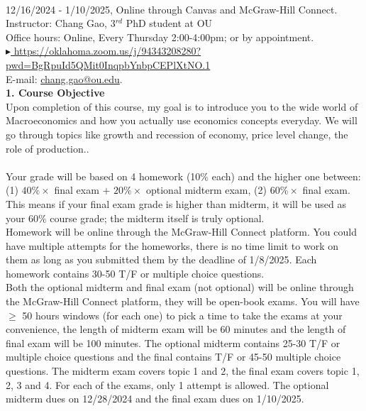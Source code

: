 \documentclass[12pt,letterpaper]{article}
\begin{document}
\bigskip\\
 12/16/2024 - 1/10/2025, Online through Canvas and McGraw-Hill Connect.\medskip\\
\noindent Instructor: Chang Gao, 3$^{\textit{rd}}$ PhD student at OU\medskip\\
\noindent Office hours: Online, Every Thursday 2:00-4:00pm; or by appointment.\medskip\\ \href{https://oklahoma.zoom.us/j/94343208280?pwd=BgRpuId5QMit0InqpbYnbpCEPlXtNO.1
}{\color{blue}$\blacktriangleright$ https://oklahoma.zoom.us/j/94343208280?pwd=BgRpuId5QMit0InqpbYnbpCEPlXtNO.1
}\\
\noindent E-mail: \href{mailto:chang.gao@ou.edu}{chang.gao@ou.edu}.\bigskip\\
{\bf 1. Course Objective}\medskip\\
Upon completion of this course, my goal is to introduce you to the wide world of Macroeconomics and how you actually use economics concepts everyday. We will go through topics like growth and recession of economy, price level change, the role of production..\bigskip\\
\medskip\\
Your grade will be based on 4 homework (10\% each) and {\color{red}the higher one between}: (1) $40\%\times$  final exam $+$ $20\%\times$ optional midterm exam, (2) $60\%\times$ final exam. This means if your final exam grade is higher than midterm, it will be used as your $60\%$ course grade; {\color{red}the midterm itself is truly optional}.\medskip\\
Homework will be online through the McGraw-Hill Connect platform. You could have {\color{red}multiple attempts for the homeworks}, there is no time limit to work on them as long as you {\color{red}submitted them by the deadline of 1/8/2025}. Each homework contains 30-50 T/F or multiple choice questions.\medskip\\
Both the optional midterm and final exam (not optional) will be online through the McGraw-Hill Connect platform, they will be open-book exams. {\color{red}You will have $\ge$ 50 hours windows (for each one) to pick a time to take the exams at your convenience}, the length of midterm exam will be 60 minutes and the length of final exam will be 100 minutes. The optional midterm contains 25-30 T/F or multiple choice questions and the final contains T/F or 45-50 multiple choice questions. The midterm exam covers topic 1 and 2, the final exam covers topic 1, 2, 3 and 4. For each of the exams, {\color{red}only 1 attempt is allowed. The optional midterm dues on 12/28/2024 and the final exam dues on 1/10/2025.}\bigskip\\
\end{document}

